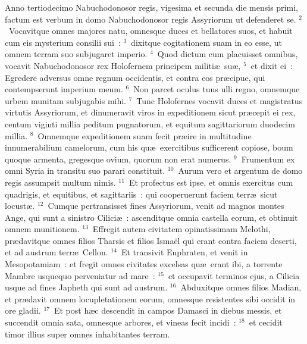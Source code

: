 \lettrine[lines=3,image=true,loversize=0.05,lraise=-0.03]{A}{}nno tertiodecimo Nabuchodonosor regis, vigesima et secunda die mensis primi, factum est verbum in domo Nabuchodonosor regis Assyriorum ut defenderet se.
${}^{2}$~Vocavitque omnes majores natu, omnesque duces et bellatores suos, et habuit cum eis mysterium consilii sui~:
${}^{3}$~dixitque cogitationem suam in eo esse, ut omnem terram suo subjugaret imperio.
${}^{4}$~Quod dictum cum placuisset omnibus, vocavit Nabuchodonosor rex Holofernem principem militi\ae\ su\ae ,
${}^{5}$~et dixit ei~: Egredere adversus omne regnum occidentis, et contra eos pr\ae cipue, qui contempserunt imperium meum.
${}^{6}$~Non parcet oculus tuus ulli regno, omnemque urbem munitam subjugabis mihi.
${}^{7}$~Tunc Holofernes vocavit duces et magistratus virtutis Assyriorum, et dinumeravit viros in expeditionem sicut pr\ae cepit ei rex, centum viginti millia peditum pugnatorum, et equitum sagittariorum duodecim millia.
${}^{8}$~Omnemque expeditionem suam fecit pr\ae ire in multitudine innumerabilium camelorum, cum his qu\ae\ exercitibus sufficerent copiose, boum quoque armenta, gregesque ovium, quorum non erat numerus.
${}^{9}$~Frumentum ex omni Syria in transitu suo parari constituit.
${}^{10}$~Aurum vero et argentum de domo regis assumpsit multum nimis.
${}^{11}$~Et profectus est ipse, et omnis exercitus cum quadrigis, et equitibus, et sagittariis~: qui cooperuerunt faciem terr\ae\ sicut locust\ae .
${}^{12}$~Cumque pertransisset fines Assyriorum, venit ad magnos montes Ange, qui sunt a sinistro Cilici\ae~: ascenditque omnia castella eorum, et obtinuit omnem munitionem.
${}^{13}$~Effregit autem civitatem opinatissimam Melothi, pr\ae davitque omnes filios Tharsis et filios Isma\"el qui erant contra faciem deserti, et ad austrum terr\ae\ Cellon.
${}^{14}$~Et transivit Euphraten, et venit in Mesopotamiam~: et fregit omnes civitates excelsas qu\ae\ erant ibi, a torrente Mambre usquequo perveniatur ad mare~:
${}^{15}$~et occupavit terminos ejus, a Cilicia usque ad fines Japheth qui sunt ad austrum.
${}^{16}$~Abduxitque omnes filios Madian, et pr\ae davit omnem locupletationem eorum, omnesque resistentes sibi occidit in ore gladii.
${}^{17}$~Et post h\ae c descendit in campos Damasci in diebus messis, et succendit omnia sata, omnesque arbores, et vineas fecit incidi~:
${}^{18}$~et cecidit timor illius super omnes inhabitantes terram.

